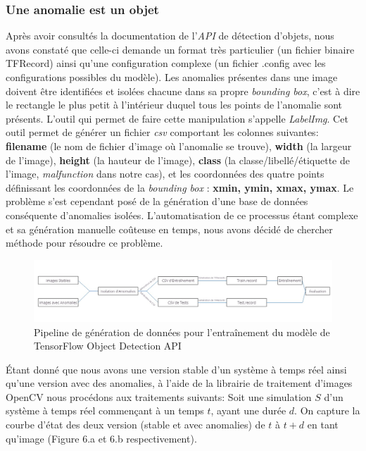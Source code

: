 \documentclass[french]{article}
\theoremstyle{mytheoremstyle}
\theoremstyle{mytheoremstyle}
\theoremstyle{myproblemstyle}
\begin{document}
        \subsubsection{Une anomalie est un objet}
        Après avoir consultés la documentation de l'\emph{API} de détection d'objets, nous avons constaté que celle-ci demande un format très particulier (un fichier binaire TFRecord) ainsi qu'une configuration complexe (un fichier .config avec les configurations possibles du modèle). Les anomalies présentes dans une image doivent être identifiées et isolées chacune dans sa propre \emph{bounding box}, c'est à dire le rectangle le plus petit à l'intérieur duquel tous les points de l'anomalie sont présents. L'outil qui permet de faire cette manipulation s'appelle \emph{LabelImg}. Cet outil permet de générer un fichier \emph{csv} comportant les colonnes suivantes: \textbf{filename} (le nom de fichier d'image où l'anomalie se trouve), \textbf{width} (la largeur de l'image), \textbf{height} (la hauteur de l'image), \textbf{class} (la classe/libellé/étiquette de l'image, \emph{malfunction} dans notre cas), et les coordonnées des quatre points définissant les coordonnées de la \emph{bounding box} : \textbf{xmin, ymin, xmax, ymax}. Le problème s'est cependant posé de la génération d'une  base de données conséquente d'anomalies isolées. L'automatisation de ce processus étant complexe et sa génération manuelle coûteuse en temps, nous avons décidé de chercher méthode pour résoudre ce problème.
        \begin{figure}[H]
            \centering
            \includegraphics[width=\textwidth]{images/od_datagen.jpg}
            \caption{Pipeline de génération de données pour l'entraînement du modèle de TensorFlow Object Detection API}
            \label{}
        \end{figure}
        \indent Étant donné que nous avons une version stable d'un système à temps réel ainsi qu'une version avec des anomalies, à l'aide de la librairie de traitement d'images OpenCV nous procédons aux traitements suivants:
        \newline
        Soit une simulation $S$ d'un système à temps réel commençant à un temps $t$, ayant une durée $d$. On capture la courbe d'état des deux version (stable et avec anomalies) de $t$ à $t+d$ en tant qu'image (Figure 6.a et 6.b respectivement).
\end{document}

